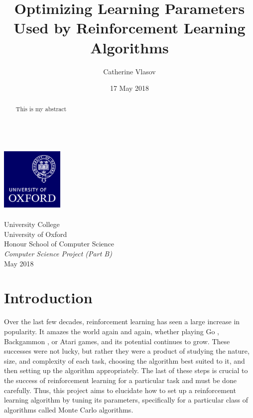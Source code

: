 \documentclass[11pt,a4paper]{report}
\author{Catherine Vlasov}
\title{Optimizing Learning Parameters Used by Reinforcement Learning Algorithms}
\date{17 May 2018}
\begin{document}
\makeatletter
	\begin{titlepage}
		\vspace*{\fill}
		\begin{center}
			{\huge \bfseries \@title }
			\\[20ex]
			\includegraphics[width=30mm]{oxlogo.png}
			\\[10ex]
			{\LARGE \@author}
			\\[3ex]
			{\Large University College}
			\\[1ex]
			{\Large University of Oxford}
			\\[8ex]
			{\Large Honour School of Computer Science}
			\\[1ex]
			{\Large \emph{Computer Science Project (Part B)}}
			\\[10ex]
			{\LARGE May 2018}
		\end{center}
		\vspace*{\fill}
	\end{titlepage}
\makeatother


\begin{abstract}
This is my abstract
\end{abstract}


\tableofcontents


\chapter{Introduction}

Over the last few decades, reinforcement learning has seen a large increase in popularity. It amazes the world again and again, whether playing Go \cite{go}, Backgammon \cite{backgammon}, or Atari \cite{atari} games, and its potential continues to grow. These successes were not lucky, but rather they were a product of studying the nature, size, and complexity of each task, choosing the algorithm best suited to it, and then setting up the algorithm appropriately. The last of these steps is crucial to the success of reinforcement learning for a particular task and must be done carefully. Thus, this project aims to elucidate how to set up a reinforcement learning algorithm by tuning its parameters, specifically for a particular class of algorithms called Monte Carlo algorithms.
\end{document}
